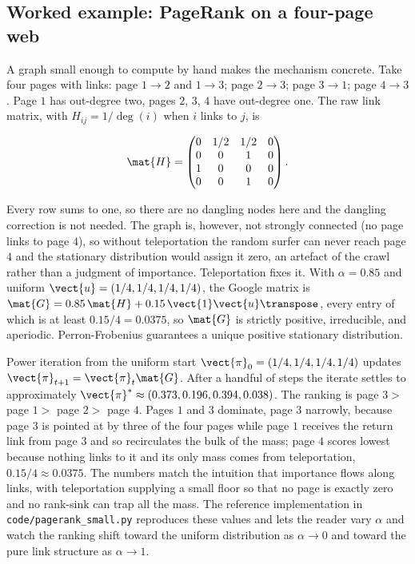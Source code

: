 \subsection{Worked example: PageRank on a four-page web}

A graph small enough to compute by hand makes the mechanism
concrete. Take four pages with links: page $1 \to 2$ and $1 \to 3$;
page $2 \to 3$; page $3 \to 1$; page $4 \to 3$. Page $1$ has
out-degree two, pages $2$, $3$, $4$ have out-degree one. The raw
link matrix, with $H_{ij} = 1/\deg(i)$ when $i$ links to $j$, is

\[
\mat{H} = \begin{pmatrix}
0 & 1/2 & 1/2 & 0 \\
0 & 0 & 1 & 0 \\
1 & 0 & 0 & 0 \\
0 & 0 & 1 & 0
\end{pmatrix}.
\]

Every row sums to one, so there are no dangling nodes here and the
dangling correction is not needed. The graph is, however, not
strongly connected (no page links to page $4$), so without
teleportation the random surfer can never reach page $4$ and the
stationary distribution would assign it zero, an artefact of the
crawl rather than a judgment of importance. Teleportation fixes it.
With $\alpha = 0.85$ and uniform $\vect{u} = (1/4, 1/4, 1/4, 1/4)$,
the Google matrix is $\mat{G} = 0.85\,\mat{H} + 0.15\,\vect{1}
\vect{u}\transpose$, every entry of which is at least $0.15/4 =
0.0375$, so $\mat{G}$ is strictly positive, irreducible, and
aperiodic. Perron-Frobenius guarantees a unique positive stationary
distribution.

Power iteration from the uniform start $\vect{\pi}_{0} = (1/4, 1/4,
1/4, 1/4)$ updates $\vect{\pi}_{t+1} = \vect{\pi}_{t} \mat{G}$.
After a handful of steps the iterate settles to approximately
$\vect{\pi}^{*} \approx (0.373, 0.196, 0.394, 0.038)$. The ranking
is page $3 > $ page $1 > $ page $2 > $ page $4$. Pages $1$ and $3$
dominate, page $3$ narrowly, because page $3$ is pointed at by three
of the four pages while page $1$ receives the return link from page
$3$ and so recirculates the bulk of the mass; page $4$ scores lowest
because nothing links to it and its only mass comes from
teleportation, $0.15/4 \approx 0.0375$. The numbers match the
intuition that importance flows along
links, with teleportation supplying a small floor so that no page is
exactly zero and no rank-sink can trap all the mass. The reference
implementation in \texttt{code/pagerank\_small.py} reproduces these
values and lets the reader vary $\alpha$ and watch the ranking shift
toward the uniform distribution as $\alpha \to 0$ and toward the
pure link structure as $\alpha \to 1$.

